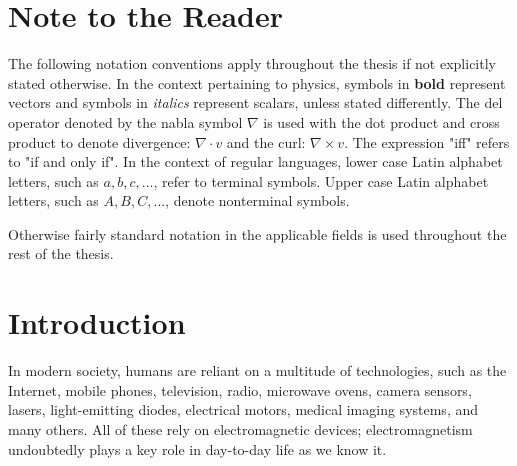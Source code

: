 



\chapter{Note to the Reader}
The following notation conventions apply throughout the thesis if not explicitly stated otherwise.  In the context pertaining to physics, symbols in \textbf{bold} represent vectors and symbols in \emph{italics} represent scalars, unless stated differently.
The del operator denoted by the nabla symbol $\nabla$ is used with the dot product and cross product to denote divergence: $\nabla \cdot v$ and the curl: $\nabla \times v$.
The expression "iff" refers to "if and only if".
In the context of regular languages, lower case Latin alphabet letters, such as $a, b, c, \dots$, refer to terminal symbols. Upper case Latin alphabet letters, such as $A, B, C,\dots$, denote nonterminal symbols.

Otherwise fairly standard notation in the applicable fields is used throughout the rest of the thesis. 

\chapter{Introduction}
In modern society, humans are reliant on a multitude of technologies, such as the Internet, mobile phones, television, radio, microwave ovens, camera sensors, lasers, light-emitting diodes, electrical motors, medical imaging systems, and many others. All of these rely on electromagnetic devices; electromagnetism undoubtedly plays a key role in day-to-day life as we know it.


